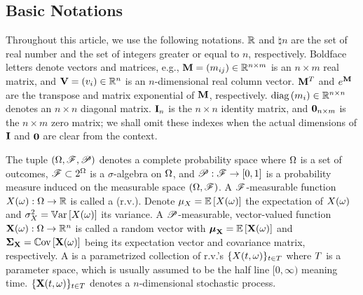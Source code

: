\subsection{Basic Notations}
Throughout this article, we use the following notations. $\mathbb{R}$ and $\natural{n}$ are the set of real number and the set of integers greater or equal to $n$, respectively. Boldface letters denote vectors and matrices, e.g., $\m{M} = \mtx{m_{ij}} \in \real^{n \times m}$ is an $n \times m$ real matrix, and $\mathbf{V} = (v_i) \in \mathbb{R}^n$ is an $n$-dimensional real column vector. $\m{M}^T$ and $e^\m{M}$ are the transpose and matrix exponential of $\m{M}$, respectively. $\text{diag}\left(m_i\right) \in \mathbb{R}^{n \times n}$ denotes an $n \times n$ diagonal matrix. $\mI_n$ is the $n \times n$ identity matrix, and $\mZero_{n \times m}$ is the $n \times m$ zero matrix; we shall omit these indexes when the actual dimensions of $\mI$ and $\mZero$ are clear from the context.

The tuple $(\Omega, \mathscr{F}, \mathscr{P})$ denotes a complete probability space \cite{durrett2010} where $\Omega$ is a set of outcomes, $\mathscr{F} \subset 2^\Omega$ is a $\sigma$-algebra on $\Omega$, and $\mathscr{P}: \mathscr{F} \to [0, 1]$ is a probability measure induced on the measurable space $(\Omega, \mathscr{F})$. A $\mathscr{F}$-measurable function $\rv{X}(\o): \outcomes \to \real$ is called a  (r.v.). Denote $\exp_\rv{X} = \oExp{\rv{X}(\o)}$ the expectation of $\rv{X}(\o)$ and $\var_\rv{X} = \oVar{\rv{X}(\o)}$ its variance. A $\mathscr{P}$-measurable, vector-valued function $\mrv{X}(\o): \outcomes \to \real^n$ is called a random vector with $\vExp_\mrv{X} = \oExp{\mrv{X}(\o)}$ and $\mCov_\mrv{X} = \oCov{\mrv{X}(\o)}$ being its expectation vector and covariance matrix, respectively. A  is a parametrized collection of r.v.'s $\{ \rv{X}(\t, \o) \}_{\t \in \sTime}$ where $T$ is a parameter space, which is usually assumed to be the half line $[0, \infty)$ meaning time. $\{ \mrv{X}(\t, \o) \}_{\t \in \sTime}$ denotes a $n$-dimensional stochastic process.

